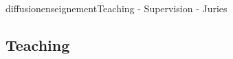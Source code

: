 \documentclass{ra2016}
\begin{document}
\begin{module}{diffusion}{enseignement}{Teaching - Supervision - Juries}

\subsection{Teaching}



%



\end{module}
\end{document}

